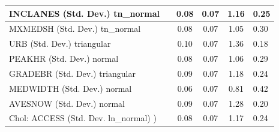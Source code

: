 \begin{table}
\begin{center}
\begin{tabular}{|l|l|c|c|c|l|}
			\hline
			INCLANES (Std. Dev.) tn_normal &  & 0.08 & 0.07 & 1.16 & 0.25 \\
			\hline
			MXMEDSH (Std. Dev.) tn_normal &  & 0.08 & 0.07 & 1.05 & 0.30 \\
			\hline
			URB (Std. Dev.) triangular &  & 0.10 & 0.07 & 1.36 & 0.18 \\
			\hline
			PEAKHR (Std. Dev.) normal &  & 0.08 & 0.07 & 1.06 & 0.29 \\
			\hline
			GRADEBR (Std. Dev.) triangular &  & 0.09 & 0.07 & 1.18 & 0.24 \\
			\hline
			MEDWIDTH (Std. Dev.) normal &  & 0.06 & 0.07 & 0.81 & 0.42 \\
			\hline
			AVESNOW (Std. Dev.) normal &  & 0.09 & 0.07 & 1.28 & 0.20 \\
			\hline
			 Chol: ACCESS (Std. Dev. ln_normal) ) &  & 0.08 & 0.07 & 1.17 & 0.24 \\
			\hline
		\end{tabular}
	\end{center}
\end{table}